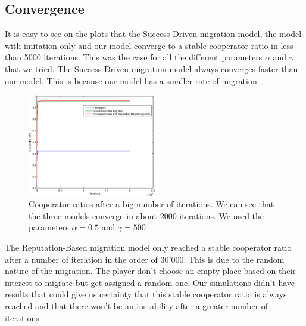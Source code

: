 \documentclass[11pt]{article}
\begin{document}
\subsection{Convergence}
It is easy to see on the plots that the Success-Driven migration model, the model with imitation only and our model converge to a stable cooperator ratio in less than 5000 iterations. This was the case for all the different parameters $\alpha$ and $\gamma$ that we tried.
The Success-Driven migration model always converges faster than our model. This is because our model has a smaller rate of migration.
\begin{figure}
	\centering
        \includegraphics[width=0.5\textwidth]{../../other/plots/convergence-20000.eps}
	\caption{Cooperator ratios after a big number of iterations. We can see that the three models converge in about 2000 iterations. We used the parameters $\alpha = 0.5$ and $\gamma = 500$}
\end{figure}

The Reputation-Based migration model only reached a stable cooperator ratio after a number of iteration in the order of 30'000. This is due to the random nature of the migration. The player don't choose an empty place based on their interest to migrate but get assigned a random one. Our simulations didn't have results that could give us certainty that this stable cooperator ratio is always reached and that there won't be an instability after a greater number of iterations.
\end{document}

